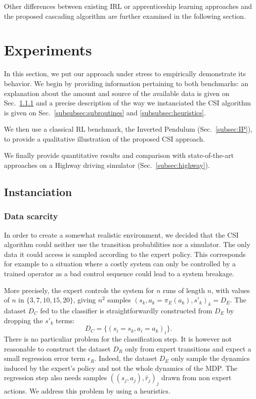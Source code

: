 \documentclass[smallextended]{svjour3}
\begin{document}
Other differences between existing IRL or apprenticeship learning approaches and the proposed cascading algorithm are further examined in the following section.

\section{Experiments}
\label{sec:experiments}
In this section, we put our approach under stress to empirically demonstrate its behavior. We begin by providing information pertaining to both benchmarks: an explanation about the amount and source of the available data is given on Sec.~\ref{subsubsec:data} and a precise description of the way we instanciated the CSI algorithm is given on Sec.~\ref{subsubsec:subroutines} and \ref{subsubsec:heuristics}. 

We then use a classical RL benchmark, the Inverted Pendulum (Sec.~\ref{subsec:IP}), to provide a qualitative illustration of the proposed CSI approach.

We finally provide quantitative results and comparison with state-of-the-art approaches on a Highway driving simulator (Sec.~\ref{subsec:highway}).
\subsection{Instanciation}
\label{subsec:instanciation}
\subsubsection{Data scarcity}
\label{subsubsec:data}
In order to create a somewhat realistic environment, we decided that the CSI algorithm could neither use the transition probabilities nor a simulator. The only data it could access is sampled according to the expert policy. This corresponds for example to a situation where a costly system can only be controlled by a trained operator as a bad control sequence could lead to a system breakage.

More precisely, the expert controls the system for $n$ runs of length $n$, with values of $n$ in $\{3,7,10,15,20\}$, giving $n^2$ samples $(s_k,a_k=\pi_E(a_k),s'_k)_k = D_E$. The dataset $D_C$ fed to the classifier is straightforwardly constructed from $D_E$ by dropping the $s'_k$ terms:
\begin{equation}
  D_C = \{(s_i = s_k,a_i=a_k)_i\}.
\end{equation}
There is no particuliar problem for the classification step. It is however not reasonable to construct the dataset $D_R$ only from expert transitions and expect a small regression error term $\epsilon_R$. Indeed, the dataset $D_E$ only sample the dynamics induced by the expert's policy and not the whole dynamics of the MDP. The regression step also needs samples $((s_j,a_j),\hat r_j)_j$ drawn from non expert actions. We address this problem by using a heuristics.
\end{document}
